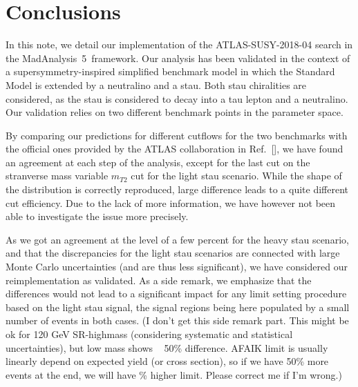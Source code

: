 \documentclass{ws-mpla}
\newcommand{\madanalysis}{{\sc MadAnalysis~5}}
\begin{document}
\section{Conclusions}\label{sec:conc}

In this note, we detail our implementation of the ATLAS-SUSY-2018-04 search in the \madanalysis\ framework. Our analysis has been validated in the context of a supersymmetry-inspired simplified benchmark model in which the Standard Model is extended by a neutralino and a stau. Both stau chiralities are considered, as the stau is considered to decay into a tau lepton and a neutralino. Our validation relies on two different benchmark points in the parameter space.

By comparing our predictions for different cutflows for the two benchmarks with the official ones provided by the ATLAS collaboration in Ref.~[], we have found an agreement at each step of the analysis, except for the last cut on the stranverse mass variable $m_{T2}$ cut for the light stau scenario. While the shape of the distribution is correctly reproduced, large difference leads to a quite different cut efficiency. Due to the lack of more information, we have however not been able to investigate the issue more precisely.

As we got an agreement at the level of a few percent for the heavy stau scenario, and that the discrepancies for the light stau scenarios are connected with large Monte Carlo uncertainties (and are thus less significant), we have considered our reimplementation as validated.
As a side remark, we emphasize that the differences would not lead to a significant impact for any limit setting procedure based on the light stau signal, the signal regions being here populated by a small number of events in both cases.
{\color{blue}(I don't get this side remark part. This might be ok for 120 GeV SR-highmass (considering systematic and statistical uncertainties), but low mass shows ~ 50\% difference. AFAIK limit is usually linearly depend on expected yield (or cross section), so if we have 50\% more events at the end, we will have \% higher limit. Please correct me if I'm wrong.)}


\end{document}
